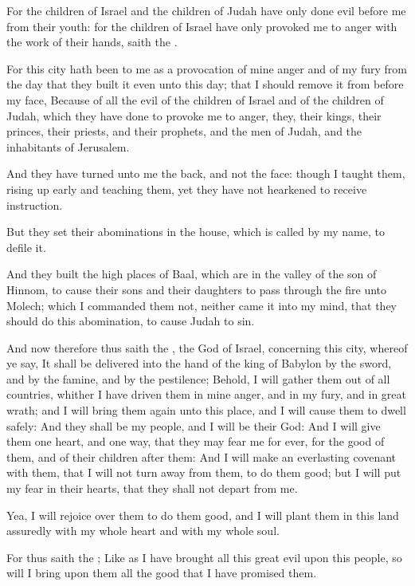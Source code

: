 \Verse For the children of Israel and the children of Judah have only done evil before me from their youth: for the children of Israel have only provoked me to anger with the work of their hands, saith the \LORD.

\Verse For this city hath been to me as a provocation of mine anger and of my fury from the day that they built it even unto this day; that I should remove it from before my face, \Verse Because of all the evil of the children of Israel and of the children of Judah, which they have done to provoke me to anger, they, their kings, their princes, their priests, and their prophets, and the men of Judah, and the inhabitants of Jerusalem.

\Verse And they have turned unto me the back, and not the face: though I taught them, rising up early and teaching them, yet they have not hearkened to receive instruction.

\Verse But they set their abominations in the house, which is called by my name, to defile it.

\Verse And they built the high places of Baal, which are in the valley of the son of Hinnom, to cause their sons and their daughters to pass through the fire unto Molech; which I commanded them not, neither came it into my mind, that they should do this abomination, to cause Judah to sin.

\Verse And now therefore thus saith the \LORD, the God of Israel, concerning this city, whereof ye say, It shall be delivered into the hand of the king of Babylon by the sword, and by the famine, and by the pestilence; \Verse Behold, I will gather them out of all countries, whither I have driven them in mine anger, and in my fury, and in great wrath; and I will bring them again unto this place, and I will cause them to dwell safely: \Verse And they shall be my people, and I will be their God: \Verse And I will give them one heart, and one way, that they may fear me for ever, for the good of them, and of their children after them: \Verse And I will make an everlasting covenant with them, that I will not turn away from them, to do them good; but I will put my fear in their hearts, that they shall not depart from me.

\Verse Yea, I will rejoice over them to do them good, and I will plant them in this land assuredly with my whole heart and with my whole soul.

\Verse For thus saith the \LORD; Like as I have brought all this great evil upon this people, so will I bring upon them all the good that I have promised them.

